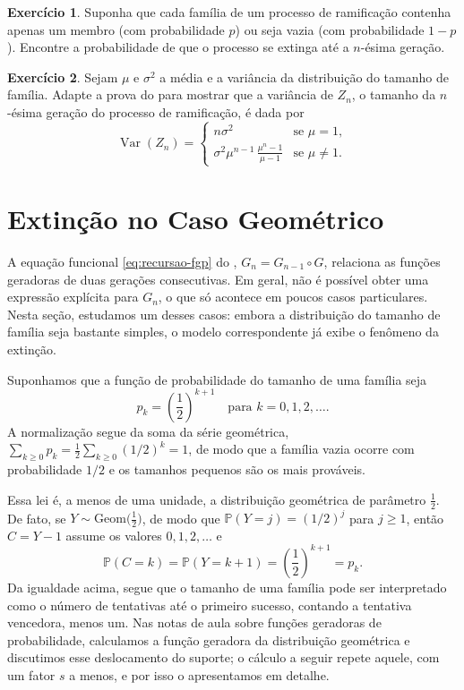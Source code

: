 \documentclass[12pt,portuguese]{article}
\theoremstyle{definition}
\theoremstyle{plainexercise}
\newtheorem{exercise}{Exercício}
\theoremstyle{starredexercise}
\theoremstyle{definition}
\begin{document}
\begin{exercise}\label{exercise:extincao-bernoulli}
Suponha que cada família de um processo de ramificação
contenha apenas um membro (com probabilidade $p$) ou seja vazia
(com probabilidade $1-p$). Encontre a probabilidade de que o processo
se extinga até a $n$-ésima geração.
\end{exercise}

\begin{exercise}\label{exercise:variancia-geracao}
Sejam $\mu$ e $\sigma^2$ a média e a variância da distribuição do
tamanho de família. Adapte a prova do  para
mostrar que a variância de $Z_n$, o tamanho da $n$-ésima geração do
processo de ramificação, é dada por
\[
\operatorname{Var}(Z_n) =
\begin{cases}
n\sigma^2 & \text{se } \mu=1,\\[0.4cm]
\sigma^2\mu^{n-1}\, \displaystyle\frac{\mu^n-1}{\mu-1} & \text{se } \mu\neq 1.
\end{cases}
\]
\end{exercise}
\section{Extinção no Caso Geométrico}\label{sec:exemplo}

A equação funcional \eqref{eq:recursao-fgp} do ,
$G_n=G_{n-1}\circ G$, relaciona as funções geradoras de duas gerações
consecutivas. Em geral, não é possível obter uma expressão explícita
para $G_n$, o que só acontece em poucos casos particulares. Nesta seção,
estudamos um desses casos: embora a distribuição do tamanho de família
seja bastante simples, o modelo correspondente já exibe o fenômeno da
extinção.

Suponhamos que a função de probabilidade do tamanho de uma família seja
\[
p_k=\left(\frac{1}{2}\right)^{k+1}
\quad\text{para } k=0,1,2,\ldots.
\]
A normalização segue da soma da série geométrica,
$\sum_{k\geqslant 0}p_k=\tfrac{1}{2}\sum_{k\geqslant 0}(1/2)^k=1$, de modo
que a família vazia ocorre com probabilidade $1/2$ e os tamanhos pequenos
são os mais prováveis.

Essa lei é, a menos de uma unidade, a distribuição geométrica de parâmetro
$\tfrac{1}{2}$. De fato, se $Y\sim\mathrm{Geom}\bigl(\tfrac{1}{2}\bigr)$, de
modo que $\mathbb{P}(Y=j)=(1/2)^{j}$ para $j\geqslant 1$, então $C=Y-1$
assume os valores $0,1,2,\ldots$ e
\[
\mathbb{P}(C=k)=\mathbb{P}(Y=k+1)=\left(\frac{1}{2}\right)^{k+1}=p_k.
\]
Da igualdade acima, segue que o tamanho de uma família pode ser interpretado
como o número de tentativas até o primeiro
sucesso, contando a tentativa vencedora, menos um. Nas notas de aula sobre
funções geradoras de probabilidade, calculamos a função geradora da distribuição
geométrica e discutimos esse deslocamento do suporte; o cálculo a seguir repete
aquele, com um fator $s$ a menos, e por isso o apresentamos em detalhe.
\end{document}
